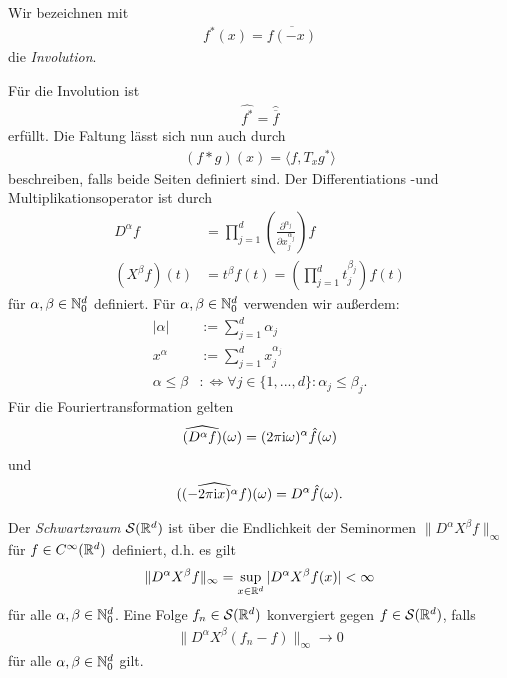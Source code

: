 \begin{df}
Wir bezeichnen mit
\begin{align}\label{eq:involution}
f^\ast(x) = \overline{f(-x)}
\end{align}
die \textit{Involution}.	
\end{df}
Für die Involution ist 
\begin{align}\label{eq:involution_fouriertrans}
\widehat{f^\ast} = \hat{\overline{f}}
\end{align}
erfüllt. Die Faltung lässt sich nun auch durch
\begin{align}\label{eq:convolution_with_translation}
(f \ast g)(x) = \langle f, T_x g^\ast \rangle
\end{align}
beschreiben, falls beide Seiten definiert sind.
Der Differentiations -und Multiplikationsoperator ist durch
\begin{align*}
D^\alpha f
&=
\prod \limits_{j=1}^d \left(\frac{\partial^{\alpha_j} }{\partial x_j^{\alpha_j}}\right) f\\
(X^\beta f)(t)
&= t^\beta f(t) 
=
\left(\prod \limits_{j = 1}^d t_j^{\beta_j}\right) f(t)
\end{align*}
für $ \alpha,\beta \in \mathbb{N}_0^d $ definiert.
Für $ \alpha ,\beta\in \mathbb{N}_0^d $ verwenden wir außerdem:
\begin{align*}
|\alpha | &:= \sum \limits_{j =1}^d \alpha_j\\
x^\alpha &:= \sum \limits_{j=1}^d x_j^{\alpha_j}\\
\alpha \leq \beta &:\Leftrightarrow
\forall j \in \{1,...,d\} : \alpha_j \leq \beta_j.
\end{align*}
Für die Fouriertransformation gelten
\begin{align}\label{eq:fourier_derivate_1}
\widehat{(D^\alpha f)}(\omega)
=(2 \pi  \textrm{i} \omega)^\alpha \hat{f}(\omega)
\end{align}
und 
\begin{align}\label{eq:fourier_derivate_2}
\widehat{((- 2 \pi \textrm{i} x)^\alpha f)}(\omega)
=
D^\alpha \hat{f}(\omega).
\end{align}

Der \textit{Schwartzraum} $ \mathcal{S}(\mathbb{R}^d) $ ist über die Endlichkeit der Seminormen $ \| D^\alpha X^\beta f \|_\infty $ für $ f \in C^\infty(\mathbb{R}^d) $ definiert, d.h. es gilt
\begin{align*}
\| D^\alpha X^\beta f \|_\infty
=
\sup \limits_{x \in \mathbb{R}^d} | D^\alpha X^\beta f(x) |
 < \infty
\end{align*}
für alle $ \alpha,\beta \in \mathbb{N}_0^d $.
Eine Folge $ f_n \in \mathcal{S}(\mathbb{R}^d) $ konvergiert gegen $ f \in \mathcal{S}(\mathbb{R}^d) $, falls
\begin{align}
\| D^\alpha X^\beta (f_n - f ) \|_\infty \to 0
\end{align}
für alle $ \alpha,\beta \in \mathbb{N}_0^d $ gilt.

